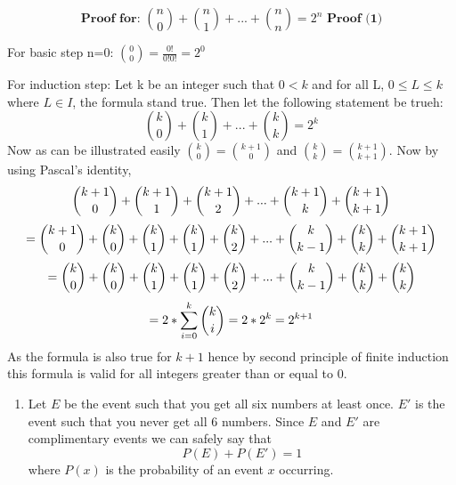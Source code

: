 \documentclass[10pt]{article}
\newenvironment{solution}[2][Solution]{ \begin{trivlist}
\item[\hskip \labelsep {\bfseries #1}]}{\end{trivlist}}
\begin{document}
\begin{solution}{1}
\item[]
    $$\textbf{Proof for: }{n \choose 0} + {n \choose 1} + ... + {n \choose n} = 2^n\textbf{  Proof (1)}$$

    For basic step n=0:
    $\binom{0}{0}=\frac{0!}{0!0!}=2^0$

    For induction step:
    Let k be an integer such that $0 < {k}$ and for all L, $0\le{L}\le{k}$ where $L\in{I}$, the formula stand true.
    Then let the following statement be trueh:
    $$\binom{k}{0}+\binom{k}{1}+...+\binom{k}{k}=2^k$$
    Now as can be illustrated easily $\binom{k}{0}=\binom{k+1}{0}$ and $\binom{k}{k}=\binom{k+1}{k+1}$.
    Now by using Pascal's identity,
    $$
        \binom{k+1}{0}+\binom{k+1}{1}+\binom{k+1}{2}+...+\binom{k+1}{k}+\binom{k+1}{k+1}\\$$ $$
        =\binom{k+1}{0}+\binom{k}{0}+\binom{k}{1}+\binom{k}{1}+\binom{k}{2}+...+\binom{k}{k-1}+\binom{k}{k}+\binom{k+1}{k+1}\\ $$ $$
        =\binom{k}{0}+\binom{k}{0}+\binom{k}{1}+\binom{k}{1}+\binom{k}{2}+...+\binom{k}{k-1}+\binom{k}{k}+\binom{k}{k}\\ $$ $$
        =2*{\sum_{i=0}^k\binom{k}{i}}\\=2*2^k\\=2^{k+1}
    $$
    As the formula is also true for $k+1$ hence by second principle of finite induction this formula is valid for all integers greater than or equal to $0$.\\
\begin{enumerate}[label=(\alph*)]
    \parskip=0in
    \parsep=0in
    \itemsep=0.1in
    \item Let $E$ be the event such that you get all six numbers at least once. $E'$ is the event such that you never get all 6 numbers. Since $E$ and $E'$ are complimentary events we can safely say that $$P(E) + P(E') = 1$$ where $P(x)$ is the probability of an event $x$ occurring.


\end{enumerate}
\end{solution}
\end{document}
